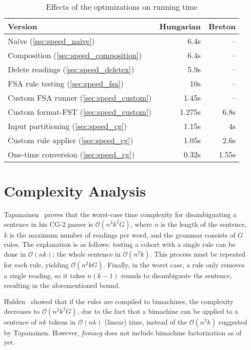 \documentclass[11pt]{article}
\begin{document}
\begin{table}[h]
  \centering
  \caption{Effects of the optimizations on running time}
  \label{tab:evaluation}
  \begin{tabular}{ | l | r | r | }
  \hline
  \textbf{Version} & \textbf{Hungarian} & \textbf{Breton} \\
  \hline
  Naïve (\ref{sec:speed_naive})                 & 6.4s   & -- \\
  Composition (\ref{sec:speed_composition})     & 6.4s   & -- \\
  Delete readings (\ref{sec:speed_deletex})     & 5.9s   & -- \\
  FSA rule testing (\ref{sec:speed_fsa})        & 10s    & -- \\
  Custom FSA runner (\ref{sec:speed_custom})    & 1.45s  & -- \\
  Custom format-FST (\ref{sec:speed_custom})    & 1.275s & 6.8s \\
  Input partitioning (\ref{sec:speed_cg})       & 1.15s  & 4s \\
  Custom rule applier (\ref{sec:speed_cg})      & 1.05s  & 2.6s \\
  One-time conversion (\ref{sec:speed_cg})      & 0.32s  & 1.55s \\
  \hline
  \end{tabular}
\end{table}

\section{Complexity Analysis}
\label{sec:complex}

Tapanainen~ proves that the worst-case time complexity
for disambiguating a sentence in his CG-2 parser is $\mathcal{O}(n^3k^2G)$,
where $n$ is the length of the sentence, $k$ is the maximum number of readings
per word, and the grammar consists of $G$ rules. The explanation is as follows:
testing a cohort with a single rule can be done in $\mathcal{O}(nk)$; 
the whole sentence in $\mathcal{O}(n^2k)$. This process must be repeated for
each rule, yielding $\mathcal{O}(n^2kG)$. Finally, in the worst case, a rule
only removes a single reading, so it takes $n(k - 1)$ rounds to disambiguate the
sentence, resulting in the aforementioned bound.

Hulden~ showed that if the rules are compiled to bimachines,
the complexity decreases to $\mathcal{O}(n^2k^2G)$, due to the fact that a
bimachine can be applied to a sentence of $nk$ tokens in $\mathcal{O}(nk)$
(linear) time, instead of the $\mathcal{O}(n^2k)$ suggested by Tapanainen.
However, \emph{fomacg} does not include bimachine factorization as of yet.
\end{document}
